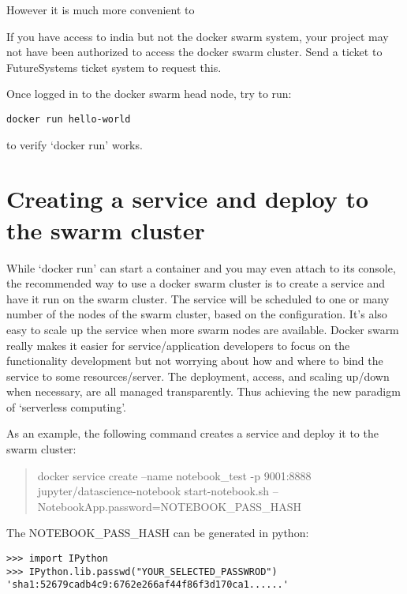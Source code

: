 {However it is much more convenient to 

\begin{NOTE}
If you have access to india but not the docker swarm
system, your project may not have been authorized to access the docker
swarm cluster. Send a ticket to FutureSystems ticket system to request
this.
\end{NOTE}

Once logged in to the docker swarm head node, try to run:

\begin{verbatim}
docker run hello-world
\end{verbatim}

to verify `docker run' works.

\section{Creating a service and deploy to the swarm
cluster}\label{creating-a-service-and-deploy-to-the-swarm-cluster}

While `docker run' can start a container and you may even attach to its
console, the recommended way to use a docker swarm cluster is to create
a service and have it run on the swarm cluster. The service will be
scheduled to one or many number of the nodes of the swarm cluster, based
on the configuration. It's also easy to scale up the service when more
swarm nodes are available. Docker swarm really makes it easier for
service/application developers to focus on the functionality development
but not worrying about how and where to bind the service to some
resources/server. The deployment, access, and scaling up/down when
necessary, are all managed transparently. Thus achieving the new
paradigm of `serverless computing'.

As an example, the following command creates a service and deploy it to
the swarm cluster:

\begin{quote}
docker service create --name notebook\_test -p 9001:8888
jupyter/datascience-notebook start-notebook.sh
--NotebookApp.password=NOTEBOOK\_PASS\_HASH
\end{quote}

The NOTEBOOK\_PASS\_HASH can be generated in python:

\begin{verbatim}
>>> import IPython
>>> IPython.lib.passwd("YOUR_SELECTED_PASSWROD")
'sha1:52679cadb4c9:6762e266af44f86f3d170ca1......'
\end{verbatim}

}
